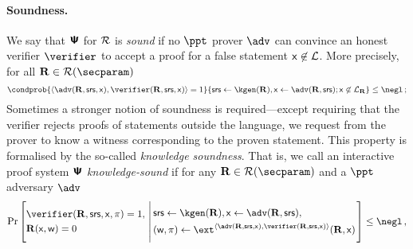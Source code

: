 \documentclass[runningheads,11pt]{llncs}
\theoremstyle{definition} \newtheorem{definition}[theorem]{Definition}
\begin{document}
\paragraph{Soundness.}
    We say that $\bm{\mathsf{\Psi}}$ for $\mathcal{R}$ is \emph{sound} if no
  $\ppt$ prover $\adv$ can convince an honest verifier $\verifier$ to accept a
  proof for a false statement $\mathsf{x} \not\in\mathcal{L}$. More precisely, for
  all $\REL \in \RELGEN(\secparam)$
	\[
      \condprob{\ip{\adv(\REL, \srs, \inp)}{\verifier(\REL, \srs, \inp)} =
        1}{\srs \gets \kgen(\REL), \inp \gets \adv(\REL, \srs); \inp \not\in
        \LANG_\REL} \leq \negl\,;
	\]
Sometimes a stronger notion of soundness is required---except requiring that the
verifier rejects proofs of statements outside the language, we request from the
prover to know a witness corresponding to the proven statement. This property is
formalised by the so-called \emph{knowledge soundness}.
That is, we call an interactive proof system $\bm{\mathsf{\Psi}}$
\emph{knowledge-sound} if for any $\REL \in \RELGEN(\secparam)$ and a $\ppt$
adversary $\adv$
	\[
	\Pr\left[
		\begin{aligned}
			& \verifier(\REL, \srs, \inp, \zkproof) = 1, \\
			& \REL(\inp, \wit) = 0
	 \end{aligned}
	  \,\left|\,
	 \begin{aligned}
		 & \srs \gets \kgen(\REL), \inp \gets \adv(\REL, \srs), \\
		 & (\wit, \zkproof) \gets \ext^{\ip{\adv(\REL, \srs, \inp)}{\verifier(\REL, \srs, \inp)}}(\REL, \inp)
	 \end{aligned}
	 \vphantom{\begin{aligned}
		 \adv (\zkproof) = 1, \\
		 \text{if $\zkproof{}$ is accepting} \\
		 \pcind \text{then $\REL(\inp, \wit)$}
	 \end{aligned}}\right.
	 \right] \leq \negl\,,
 \]
\end{document}
